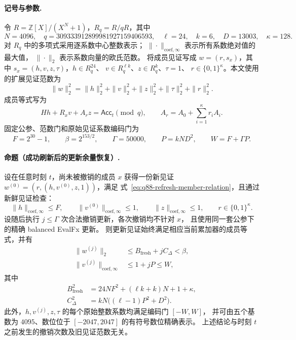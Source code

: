 
\paragraph{记号与参数.}
令 $R=\mathbb Z[X]/(X^N+1)$，$R_q=R/qR$，其中
\[
 N=4096,\quad q=309333912899981927159406593,\quad
 \ell=24,\quad k=6,\quad D=13003,\quad \kappa=128.
\]
对 $R_q$ 中的多项式采用逐系数中心整数表示；
$\|\cdot\|_{\mathrm{coef},\infty}$ 表示所有系数绝对值的最大值，
$\|\cdot\|_2$ 表示系数向量的欧氏范数。
将成员见证写成 $w=(r,s_x)$，其中
$s_x=(h,v,z,\tau)$，$h\in R_q^{24}$、
$v\in R_q^{\ell k}$、$z\in R_q^k$、$\tau=1$、
$r\in\{0,1\}^{\kappa}$。本文使用的扩展见证范数为
\[
 \|w\|_2^2=\|h\|_2^2+\|v\|_2^2+\|z\|_2^2
 +\|\tau\|_2^2+\|r\|_2^2.
\]
成员等式写为
\begin{equation}
 Hh+R_xv+A_rz=\mathsf{Acc}_t\pmod q,
 \qquad A_r=A_0+\sum_{i=1}^{\kappa}r_iA_i.
 \label{eq:q88-refresh-member-relation}
\end{equation}
固定公参、范数门和原始见证系数编码门为
\[
 F=2^{30}-1,\qquad \beta=2^{153/2},\qquad
 \Gamma=50000,\qquad P=kND^2,\qquad W=F+\Gamma P.
\]

\paragraph{命题（成功刷新后的更新余量恢复）.}
设在任意时刻 $t$，尚未被撤销的成员 $x$ 获得一份新见证
$w^{(0)}=(r,(h,v^{(0)},z,1))$，满足
式~\eqref{eq:q88-refresh-member-relation}，且通过新鲜见证检查：
\begin{equation}
 \|h\|_{\mathrm{coef},\infty}\le F,
 \qquad \|v^{(0)}\|_{\mathrm{coef},\infty}\le1,
 \qquad \|z\|_{\mathrm{coef},\infty}\le1,
 \qquad r\in\{0,1\}^{\kappa}.
 \label{eq:q88-refresh-fresh-gate}
\end{equation}
设随后执行 $j\le\Gamma$ 次合法撤销更新，各次撤销均不针对 $x$，
且使用同一套公参下的精确 balanced EvalFx 更新。
则更新见证始终满足相应当前累加器的成员等式，并有
\begin{align}
 \|w^{(j)}\|_2
 &\le B_{\mathrm{fresh}}+jC_{\Delta}<\beta,
 \label{eq:q88-refresh-norm-envelope}\\
 \|v^{(j)}\|_{\mathrm{coef},\infty}
 &\le1+jP\le W,
 \label{eq:q88-refresh-coefficient-envelope}
\end{align}
其中
\begin{align}
 B_{\mathrm{fresh}}^2
 &=24NF^2+(\ell k+k)N+1+\kappa,
 \label{eq:q88-refresh-fresh-bound}\\
 C_{\Delta}^2
 &=kN\bigl((\ell-1)P^2+D^2\bigr).
 \label{eq:q88-refresh-delta-bound}
\end{align}
此外，$h,v^{(j)},z,\tau$ 的每个原始整数系数均满足编码门 $[-W,W]$，
并可由五个基数为 $4095$、数位位于 $[-2047,2047]$ 的有符号数位精确表示。
上述结论与时刻 $t$ 之前发生的撤销次数及旧见证范数无关。

